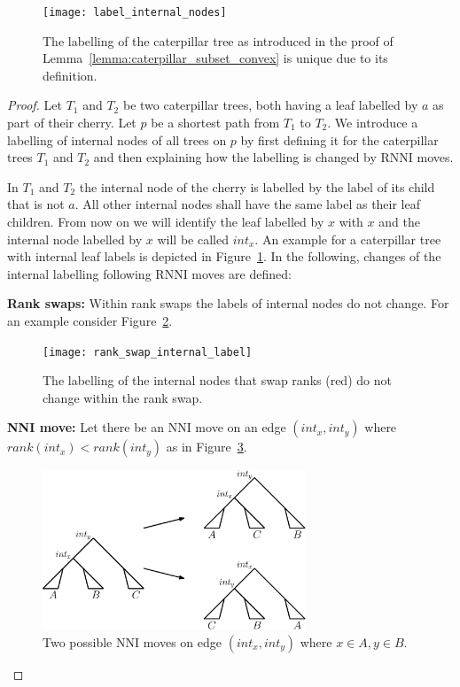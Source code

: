 \documentclass[11pt, a4paper]{article}
\newcommand{\nni}{\mathrm{NNI}}
\newcommand{\rnni}{\mathrm{RNNI}}
\begin{document}
\begin{figure}[h]
	\centering
	\texttt{[image: label\_internal\_nodes]}
	\caption{The labelling of the caterpillar tree as introduced in the proof of Lemma~\ref{lemma:caterpillar_subset_convex} is unique due to its definition.
	}
	\label{label_internal_nodes}
\end{figure}

\begin{proof}
	Let $T_1$ and $T_2$ be two caterpillar trees, both having a leaf labelled by $a$ as part of their cherry.
	Let $p$ be a shortest path from $T_1$ to $T_2$.
	We introduce a labelling of internal nodes of all trees on $p$ by first defining it for the caterpillar trees $T_1$ and $T_2$ and then explaining how the labelling is changed by $\rnni$ moves.

	In $T_1$ and $T_2$ the internal node of the cherry is labelled by the label of its child that is not $a$.
	All other internal nodes shall have the same label as their leaf children.
	From now on we will identify the leaf labelled by $x$ with $x$ and the internal node labelled by $x$ will be called $int_x$.
	An example for a caterpillar tree with internal leaf labels is depicted in Figure~\ref{label_internal_nodes}.
	In the following, changes of the internal labelling following $\rnni$ moves are defined:

	\textbf{Rank swaps:}
	Within rank swaps the labels of internal nodes do not change.
	For an example consider Figure~\ref{fig:rank_swap_internal_label}.

	\begin{figure}[H]
		\centering
		\texttt{[image: rank\_swap\_internal\_label]}
		\caption{The labelling of the internal nodes that swap ranks (red) do not change within the rank swap.
		}
		\label{fig:rank_swap_internal_label}
	\end{figure}

	\textbf{NNI move:}
	Let there be an $\nni$ move on an edge $(int_x, int_y)$ where $rank(int_x) < rank(int_y)$ as in Figure~\ref{fig:nni_moves}.

	\begin{figure}[H]
		\centering
		\includegraphics[width=0.7\textwidth]{nni_moves_internal_label}
		\caption{Two possible $\nni$ moves on edge $(int_x, int_y)$ where $x \in A, y \in B$.
		}
		\label{fig:nni_moves}
	\end{figure}


\end{proof}
\end{document}

